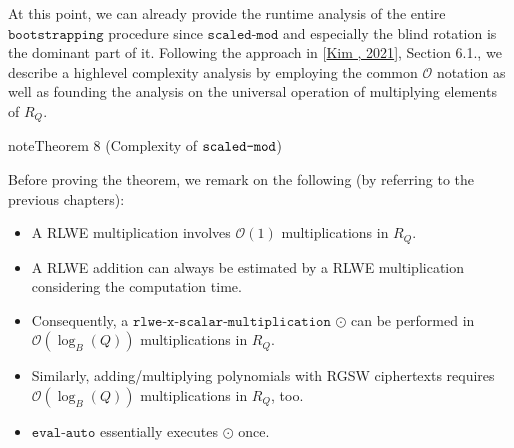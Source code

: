 \documentclass[letterpaper,10pt,english]{jupyterBook}
\begin{document}
\sphinxAtStartPar
At this point, we can already provide the runtime analysis of the entire \(\texttt{bootstrapping}\) procedure since \(\texttt{scaled-mod}\) and especially the blind rotation is the dominant part of it.
Following the approach in {[}\hyperlink{cite.Thesis:id72}{Kim , 2021}{]}, Section 6.1., we describe a high\sphinxhyphen{}level complexity analysis by employing the common \(\mathcal O\) notation as well as founding the analysis on the universal operation of multiplying elements of \(R_Q\).
\label{Thesis:complexity-of-scaled-mod}
\begin{sphinxadmonition}{note}{Theorem 8 (Complexity of \protect\(\texttt{scaled-mod}\protect\))}
\end{sphinxadmonition}

\sphinxAtStartPar
Before proving the theorem, we remark on the following (by referring to the previous chapters):
\begin{itemize}
\item {} 
\sphinxAtStartPar
A RLWE multiplication involves \(\mathcal O(1)\) multiplications in \(R_Q\).

\item {} 
\sphinxAtStartPar
A RLWE addition can always be estimated by a RLWE multiplication considering the computation time.

\item {} 
\sphinxAtStartPar
Consequently, a \(\texttt{rlwe-x-scalar-multiplication}\) \(\odot\) can be performed in \(\mathcal O(\log_B(Q))\) multiplications in \(R_Q\).

\item {} 
\sphinxAtStartPar
Similarly, adding/multiplying polynomials with RGSW ciphertexts requires \(\mathcal O(\log_B(Q))\) multiplications in \(R_Q\), too.

\item {} 
\sphinxAtStartPar
\(\texttt{eval-auto}\) essentially executes \(\odot\) once.

\end{itemize}
\end{document}
